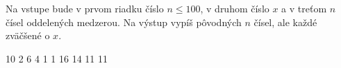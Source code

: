 




Na vstupe bude v prvom riadku číslo $n \leq 100$, v druhom číslo $x$ a v treťom $n$ čísel oddelených medzerou.
Na výstup vypíš pôvodných $n$ čísel, ale každé zväčšené o $x$.

10
2 6 4 1 1
 16 14 11 11 
\koniec


